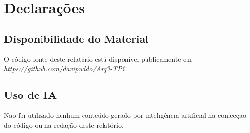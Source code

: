 \documentclass{sbc2023}%
\begin{document}
\section*{Declarações}

\subsection*{Disponibilidade do Material}

O código-fonte deste relatório está disponível publicamente em \textit{https://github.com/davipuddo/Arq3-TP2}.

\subsection*{Uso de IA}

Não foi utilizado nenhum conteúdo gerado por inteligência artificial na confecção do código ou na redação deste relatório.



\end{document}
